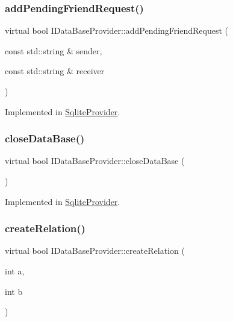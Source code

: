 \subsubsection{\texorpdfstring{add\+Pending\+Friend\+Request()}{addPendingFriendRequest()}\hspace{0.1cm}{\footnotesize\ttfamily [2/2]}}
{\footnotesize\ttfamily virtual bool I\+Data\+Base\+Provider\+::add\+Pending\+Friend\+Request (\begin{DoxyParamCaption}\item[{const std\+::string \&}]{sender,  }\item[{const std\+::string \&}]{receiver }\end{DoxyParamCaption})\hspace{0.3cm}{\ttfamily [pure virtual]}}



Implemented in \mbox{\hyperlink{classSqliteProvider_aac8f8614546a2c5e629ad84a3536adc8}{Sqlite\+Provider}}.

\mbox{\label{classIDataBaseProvider_aa7761525c25b0791d58de2429a0892ce}} 
\subsubsection{\texorpdfstring{close\+Data\+Base()}{closeDataBase()}}
{\footnotesize\ttfamily virtual bool I\+Data\+Base\+Provider\+::close\+Data\+Base (\begin{DoxyParamCaption}{ }\end{DoxyParamCaption})\hspace{0.3cm}{\ttfamily [pure virtual]}}



Implemented in \mbox{\hyperlink{classSqliteProvider_a3f54f53f319d3c9b8c5bec57f2708c07}{Sqlite\+Provider}}.

\mbox{\label{classIDataBaseProvider_adb9f20d5c7f73566b279c8564905429d}} 
\subsubsection{\texorpdfstring{create\+Relation()}{createRelation()}\hspace{0.1cm}{\footnotesize\ttfamily [1/2]}}
{\footnotesize\ttfamily virtual bool I\+Data\+Base\+Provider\+::create\+Relation (\begin{DoxyParamCaption}\item[{int}]{a,  }\item[{int}]{b }\end{DoxyParamCaption})\hspace{0.3cm}{\ttfamily [pure virtual]}}



